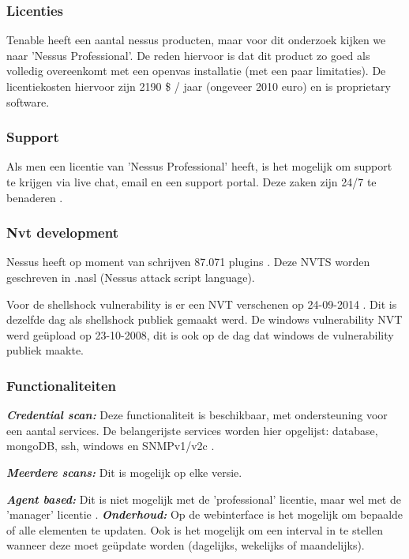 \subsubsection{Licenties}
Tenable heeft een aantal nessus producten, maar voor dit onderzoek kijken we naar 'Nessus Professional'. De reden hiervoor is dat dit product zo goed als volledig overeenkomt met een openvas installatie (met een paar limitaties). De licentiekosten hiervoor zijn 2190 \$ / jaar (ongeveer 2010 euro) en is proprietary software.
 
\subsubsection{Support}
Als men een licentie van 'Nessus Professional' heeft, is het mogelijk om support te krijgen via live chat, email en een support portal. Deze zaken zijn 24/7 te benaderen \textcite{Nessus-support}.
 
\subsubsection{Nvt development}
Nessus heeft op moment van schrijven 87.071 plugins \textcite{Nessus-nvt}. Deze NVTS worden geschreven in .nasl (Nessus attack script language).

Voor de shellshock vulnerability is er een NVT verschenen op 24-09-2014 \textcite{Vulners-shellshock-nessus}. Dit is dezelfde dag als shellshock publiek gemaakt werd. De windows vulnerability NVT werd geüpload op 23-10-2008, dit is ook op de dag dat windows de vulnerability publiek maakte.
 

\subsubsection{Functionaliteiten}
\textbf{\textit{Credential scan: }} Deze functionaliteit is beschikbaar, met ondersteuning voor een aantal services. De belangerijste services worden hier opgelijst: database, mongoDB, ssh, windows en SNMPv1/v2c \textcite{Nessus-functions}.

\textbf{\textit{Meerdere scans: }} Dit is mogelijk op elke versie.

\textbf{\textit{Agent based: }} Dit is niet mogelijk met de 'professional' licentie, maar wel met de 'manager' licentie \textcite{Nessus-functions}.
\textbf{\textit{Onderhoud: }} Op de webinterface is het mogelijk om bepaalde of alle  elementen te updaten. Ook is het mogelijk om een interval in te stellen wanneer deze moet geüpdate worden (dagelijks, wekelijks of maandelijks).

